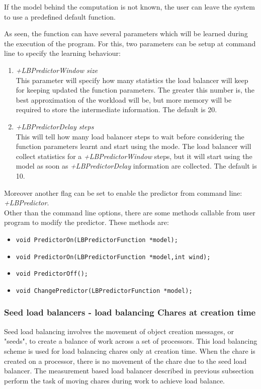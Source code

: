 If the model behind the computation is not known, the user can leave the system to
use a predefined default function.

As seen, the function can have several parameters which will be learned during
the execution of the program. For this, two parameters can be setup at command
line to specify the learning behaviour:
\begin{enumerate}
\item {\em +LBPredictorWindow size}\\
This parameter will specify how many statistics the load balancer will keep for
keeping updated the function parameters. The greater this number is, the best
approximation of the workload will be, but more memory will be required to store
the intermediate information. The default is 20.
\item {\em +LBPredictorDelay steps}\\
This will tell how many load balancer steps to wait before considering the
function parameters learnt and start using the mode. The load balancer will
collect statistics for a {\em +LBPredictorWindow} steps, but it will start using
the model as soon as {\em +LBPredictorDelay} information are collected. The
default is 10.
\end{enumerate}
Moreover another flag can be set to enable the predictor from command line: {\em
+LBPredictor}.\\
Other than the command line options, there are some methods
callable from user program to modify the predictor. These methods are:
\begin{itemize}
\item {\tt void PredictorOn(LBPredictorFunction *model);}
\item {\tt void PredictorOn(LBPredictorFunction *model,int wind);}
\item {\tt void PredictorOff();}
\item {\tt void ChangePredictor(LBPredictorFunction *model);}
\end{itemize}


\subsubsection{Seed load balancers - load balancing Chares at creation time}
\label{seedlb}

Seed load balancing involves the movement of object creation messages, or
"seeds", to create a balance of work across a set of processors. This load
balancing scheme is used for load balancing chares only at creation time. When
the chare is created on a processor, there is no movement of the chare due to
the seed load balancer. The measurement based load balancer described in
previous subsection perform the task of moving chares during work to achieve
load balance.


